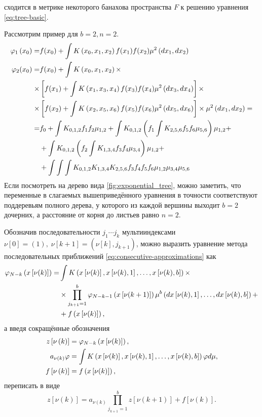 сходится в метрике некоторого банахова пространства $F$ к решению уравнения \eqref{eq:tree-basic}.

Рассмотрим пример для $b=2, n=2$.
\begin{align*}
\varphi_1\left(x_0\right) = &f(x_0) + \int K\left(x_0, x_1, x_2\right)f(x_1)f(x_2)\mu^2\left(dx_1,dx_2\right) \\
\varphi_2(x_0) = &f(x_0) + \int K\left(x_0, x_1, x_2\right)\times \\
\times&\left[f(x_1) + \int K\left(x_1, x_3, x_4\right)f(x_3)f(x_4)\mu^2\left(dx_3,dx_4\right)\right]\times \\
\times&\left[
	f(x_2) + \int K\left(x_2, x_5, x_6\right)f(x_5)f(x_6)\mu^2\left(dx_5,dx_6\right)
\right]\times\mu^2\left(dx_1,dx_2\right) =\\
=& f_0 + \int K_{0,1,2}f_1f_2\mu_{1,2} + 
	\int K_{0,1,2}\left(f_1\int K_{2,5,6}f_5f_6\mu_{5,6}\right)\mu_{1,2} + \\
	&+ \int K_{0,1,2}\left(f_2\int K_{1,3,4}f_3f_4\mu_{3,4}\right)\mu_{1,2} + \\
	&+ \int\int\int K_{0,1,2}K_{1,3,4}K_{2,5,6}f_3f_4f_5f_6\mu_{1,2}\mu_{3,4}\mu_{5,6}
\end{align*}
Если посмотреть на дерево вида \ref{fig:exponential_tree}, можно заметить, что переменные в слагаемых вышеприведённого уравнения в точности соответствуют поддеревьям полного дерева, у которого из каждой вершины выходит $b=2$ дочерних, а расстояние от корня до листьев равно $n=2$.

Обозначив последовательности $j_1\cdots j_k$ мультииндексами $\nu[0] = (1), \;\nu[k+1] = (\nu[k], j_{k+1})$, можно выразить уравнение метода последовательных приближений \eqref{eq:consecutive-approximations} как
$$
	\begin{aligned}
		\varphi_{N-k}\left(x\left[\nu(k)\right]\right) = 
		&\int K\left(
			x\left[\nu(k)\right], x\left[\nu(k),1\right], \ldots ,x\left[\nu(k),b\right]
		\right) \times \\
		&\times\prod_{j_{k+1} = 1}^b \varphi_{N-k-1}\left(x\left[\nu(k+1)\right]\right)\mu^b\left(
			dx\left[\nu(k), 1\right],\ldots,dx\left[\nu(k),b\right]
		\right) + \\
		&+ f\left(x\left[\nu(k)\right]\right),
	\end{aligned}
$$
а введя сокращённые обозначения 
$$
	\begin{aligned}
	z\left[\nu\left(k\right)\right] &= \varphi_{N-k}\left(x\left[\nu(k)\right]\right), \\
	a_{\nu\left(k\right)}\varphi &= \int K\left(
			x\left[\nu(k)\right], x\left[\nu(k),1\right], \ldots ,x\left[\nu(k),b\right]
		\right) \varphi d\mu, \\
	f\left[\nu\left(k\right)\right] &= f\left(x\left[\nu(k)\right]\right),
	\end{aligned}
$$
переписать в виде
$$
	z\left[\nu\left(k\right)\right] = a_{\nu\left(k\right)}\prod_{j_{k+1} = 1}^b z\left[\nu\left(k+1\right)\right] + f\left[\nu\left(k\right)\right].
$$


